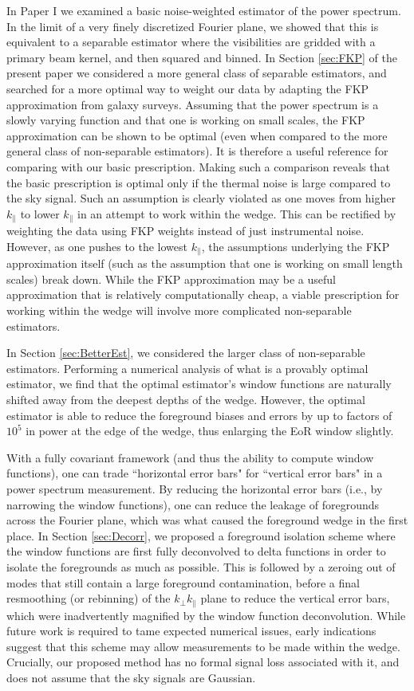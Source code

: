 \documentclass[twocolumn,aps,prd,nofootinbib,showpacs]{revtex4-1}
\begin{document}
In Paper I we examined a basic noise-weighted estimator of the power spectrum.  In the limit of a very finely discretized Fourier plane, we showed that this is equivalent to a separable estimator where the visibilities are gridded with a primary beam kernel, and then squared and binned.  In Section \ref{sec:FKP} of the present paper we considered a more general class of separable estimators, and searched for a more optimal way to weight our data by adapting the FKP approximation from galaxy surveys.  Assuming that the power spectrum is a slowly varying function and that one is working on small scales, the FKP approximation can be shown to be optimal (even when compared to the more general class of non-separable estimators).  It is therefore a useful reference for comparing with our basic prescription.  Making such a comparison reveals that the basic prescription is optimal only if the thermal noise is large compared to the sky signal.  Such an assumption is clearly violated as one moves from higher $k_\parallel$ to lower $k_\parallel$ in an attempt to work within the wedge.  This can be rectified by weighting the data using FKP weights instead of just instrumental noise.  However, as one pushes to the lowest $k_\parallel$, the assumptions underlying the FKP approximation itself (such as the assumption that one is working on small length scales) break down.  While the FKP approximation may be a useful approximation that is relatively computationally cheap, a viable prescription for working within the wedge will involve more complicated non-separable estimators.

In Section \ref{sec:BetterEst}, we considered the larger class of non-separable estimators.  Performing a numerical analysis of what is a provably optimal estimator, we find that the optimal estimator's window functions are naturally shifted away from the deepest depths of the wedge.  However, the optimal estimator is able to reduce the foreground biases and errors by up to factors of $10^5$ in power at the edge of the wedge, thus enlarging the EoR window slightly.

With a fully covariant framework (and thus the ability to compute window functions), one can trade ``horizontal error bars" for ``vertical error bars" in a power spectrum measurement.  By reducing the horizontal error bars (i.e., by narrowing the window functions), one can reduce the leakage of foregrounds across the Fourier plane, which was what caused the foreground wedge in the first place.  In Section \ref{sec:Decorr}, we proposed a foreground isolation scheme where the window functions are first fully deconvolved to delta functions in order to isolate the foregrounds as much as possible.  This is followed by a zeroing out of modes that still contain a large foreground contamination, before a final resmoothing (or rebinning) of the $k_\perp k_\parallel$ plane to reduce the vertical error bars, which were inadvertently magnified by the window function deconvolution.  While future work is required to tame expected numerical issues, early indications suggest that this scheme may allow measurements to be made within the wedge.  Crucially, our proposed method has no formal signal loss associated with it, and does not assume that the sky signals are Gaussian.
\end{document}
